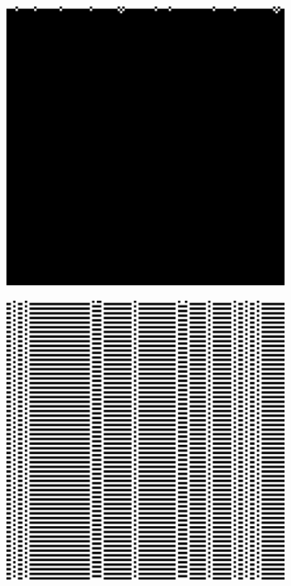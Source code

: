 \documentclass{elsarticle}
\begin{document}
\begin{multicols}{2}
	\begin{figure}[H]
		\centering
		\begin{subfigure}[]{0.45\linewidth}
			\includegraphics[width=\linewidth]{class1.pdf}
			\caption{}
		\end{subfigure}
		\begin{subfigure}[]{0.45\linewidth}
			\includegraphics[width=\linewidth]{class2.pdf}

\end{subfigure}
\end{figure}
\end{multicols}
\end{document}
